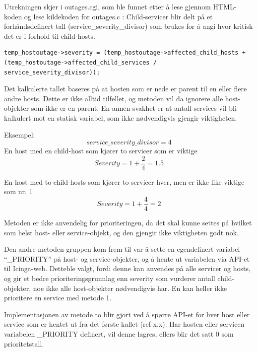 Utrekningen skjer i outages.cgi, som ble funnet etter å lese gjennom HTML-koden og lese kildekoden for outages.c \cite{dnsmichi} : 
Child-servicer blir delt på et forhåndsdefinert tall (service\_severity\_divisor) som brukes for å angi hvor kritisk det er i forhold til child-hosts.

\begin{lstlisting}[style=example]
temp_hostoutage->severity = (temp_hostoutage->affected_child_hosts + (temp_hostoutage->affected_child_services / service_severity_divisor));
\end{lstlisting}

Det kalkulerte tallet baseres på at hosten som er nede er parent til en eller flere andre hosts. Dette er ikke alltid tilfellet, og metoden vil da ignorere alle host-objekter som ikke er en parent. En annen svakhet er at antall services vil bli kalkulert mot en statisk variabel, som ikke nødvendigvis gjengir viktigheten.

Eksempel:
\begin{equation}
service\_severity\_divisor = 4 
\end{equation}
En host med en child-host som kjører to servicer som er viktige
\begin{equation}
Severity = 1 + \frac{2}{4} = 1.5
\end{equation}

En host med to child-hosts som kjører to servicer hver, men er ikke like viktige som nr. 1
\begin{equation}
Severity = 1 + \frac{4}{4} = 2
\end{equation}

Metoden er ikke anvendelig for prioriteringen, da det skal kunne settes på hvilket som helst host- eller service-objekt, og den gjengir ikke viktigheten godt nok.     

Den andre metoden gruppen kom frem til var å sette en egendefinert variabel ``\_PRIORITY'' på host- og service-objekter, og å hente ut variabelen via API-et til Icinga-web. Detteble valgt, fordi denne kan anvendes på alle servicer og hosts, og gir et bedre prioriteringsgrunnlag enn severity som vurderer antall child-objekter, noe ikke alle host-objekter nødvendigvis har. En kan heller ikke prioritere en service med metode 1.

Implementasjonen av metode to blir gjort ved å spørre API-et for hver host eller service som er hentet ut fra det første kallet (ref x.x). Har hosten eller servicen variabelen \_PRIORITY definert, vil denne lagres, ellers blir det satt 0 som prioritetstall.

